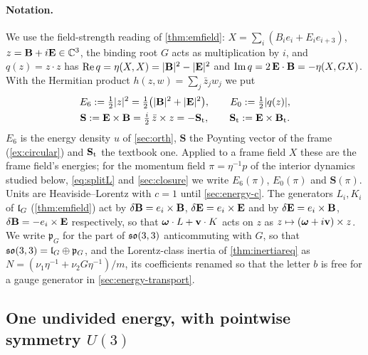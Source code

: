 \paragraph{Notation.} We use the field-strength reading of \cref{thm:emfield}: $X=\sum_i(B_ie_i+E_ie_{i+3})$, $z=\mathbf B+i\mathbf E\in\mathbb{C}^3$, the
binding root $G$ acts as multiplication by $i$, and $q(z)=z\cdot z$ has $\operatorname{Re} q=\eta(X,X)=|\mathbf B|^2-|\mathbf E|^2$ and $\operatorname{Im} q=2\,\mathbf E\cdot\mathbf B=-\eta(X,GX)$.
With the Hermitian product $h(z,w)=\sum_j\bar z_jw_j$ we put
\begin{equation}
\label{en:defs}
\begin{gathered}
E_6:=\tfrac12|z|^2=\tfrac12\bigl(|\mathbf B|^2+|\mathbf E|^2\bigr),\qquad E_0:=\tfrac12|q(z)|,\\
\mathbf S:=\mathbf E\times\mathbf B=\tfrac i2\,\bar z\times z=-\mathbf S_{\rm t},\qquad \mathbf S_{\rm t}:=\mathbf E\times\mathbf B_{\rm t} .
\end{gathered}
\end{equation}
$E_6$ is the energy density $u$ of \cref{sec:orth}, $\mathbf S$ the Poynting vector of the frame (\cref{ex:circular}) and $\mathbf S_{\rm t}$ the
textbook one. Applied to a frame field $X$ these are the frame field's energies; for the momentum field $\pi=\eta^{-1}p$ of the interior dynamics studied below, \eqref{eq:splitL}
and \cref{sec:closure} we write $E_6(\pi)$, $E_0(\pi)$ and $\mathbf S(\pi)$. Units are Heaviside--Lorentz with $c=1$ until
\cref{sec:energy-c}. The generators $L_i,K_i$ of $\mathfrak l_G$ (\cref{thm:emfield}) act by $\delta\mathbf B=e_i\times\mathbf B$, $\delta\mathbf E=e_i\times\mathbf E$ and by
$\delta\mathbf E=e_i\times\mathbf B$, $\delta\mathbf B=-e_i\times\mathbf E$ respectively, so that $\boldsymbol\omega\cdot L+\mathbf v\cdot K$ acts on $z$ as
$z\mapsto(\boldsymbol\omega+i\mathbf v)\times z$. We write $\mathfrak p_G$ for the part of $\mathfrak{so}(3,3)$ anticommuting with $G$, so that
$\mathfrak{so}(3,3)=\mathfrak l_G\oplus\mathfrak p_G$, and the Lorentz-class inertia of \cref{thm:inertiareq} as $N=(\nu_1\eta^{-1}+\nu_2G\eta^{-1})/m$, its
coefficients renamed so that the letter $b$ is free for a gauge generator in \cref{sec:energy-transport}.

\subsection{\texorpdfstring{One undivided energy, with pointwise symmetry $U(3)$}{One undivided energy, with pointwise symmetry U(3)}}
\label{sec:energy-unique}

